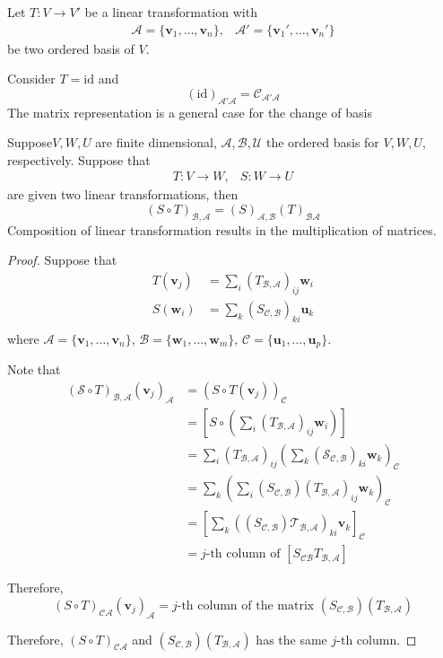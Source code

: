 \begin{remark}
Let $T:V\to V'$ be a linear transformation with 
\[
\begin{array}{ll}
\mathcal{A}=\{\bm v_1,\dots,\bm v_n\},
&
\mathcal{A}'=\{\bm v_1',\dots,\bm v_n'\}
\end{array}
\]
be two ordered basis of $V$.

Consider $T=\text{id}$ and 
\[
(\text{id})_{\mathcal{A}'\mathcal{A}}=\mathcal{C}_{\mathcal{A}'\mathcal{A}}
\]
The matrix representation is a general case for the change of basis
\end{remark}

\begin{proposition}[Functoriality]
Suppose$V,W,U$ are finite dimensional,
$\mathcal{A},\mathcal{B},\mathcal{U}$ the ordered basis for $V,W,U$, respectively. Suppose that
\[
\begin{array}{ll}
T:V\to W,
&
S:W\to U
\end{array}
\]
are given two linear transformations, then
\[
(S\circ T)_{\mathcal{B},\mathcal{A}}
=
(S)_{\mathcal{A},\mathcal{B}}(T)_{\mathcal{B}\mathcal{A}}
\]
Composition of linear transformation results in the multiplication of matrices.
\end{proposition}
\begin{proof}
Suppose that
\begin{align*}
T(\bm v_j)&=\sum_i(T_{\mathcal{B},\mathcal{A}})_{ij}\bm w_i\\
S(\bm w_i)&=\sum_k(S_{\mathcal{C},\mathcal{B}})_{ki}\bm u_k\\
\end{align*}
where $\mathcal{A}=\{\bm v_1,\dots,\bm v_n\}$, $\mathcal{B}=\{\bm w_1,\dots,\bm w_m\}$, $\mathcal{C}=\{\bm u_1,\dots,\bm u_p\}$.

Note that
\begin{align*}
(\mathcal{S}\circ T)_{\mathcal{B},\mathcal{A}}(\bm v_j)_{\mathcal{A}}
&=
(S\circ T(\bm v_j))_{\mathcal{C}}\\
&=
\left[S\circ\left(\sum_i(T_{\mathcal{B},\mathcal{A}})_{ij}\bm w_i\right)\right]\\
&=
\sum_i(T_{\mathcal{B},\mathcal{A}})_{ij}\left(
\sum_k(\mathcal{S}_{\mathcal{C},\mathcal{B}})_{ki}\bm w_k
\right)_{\mathcal{C}}\\
&=\sum_k
\left(
\sum_i(S_{\mathcal{C},\mathcal{B}})(T_{\mathcal{B},\mathcal{A}})_{ij}\bm w_k
\right)_{\mathcal{C}}\\
&=
\left[
\sum_k
(
(S_{\mathcal{C},\mathcal{B}})\mathcal{T}_{\mathcal{B},\mathcal{A}}
)_{ki}\bm v_k
\right]_{\mathcal{C}}\\
&=\text{$j$-th column of }[S_{\mathcal{C}\mathcal{B}}T_{\mathcal{B},\mathcal{A}}]
\end{align*}

Therefore,
\[
(S\circ T)_{\mathcal{C}\mathcal{A}}(\bm v_j)_{\mathcal{A}}
=
\text{$j$-th column of the matrix }(S_{\mathcal{C},\mathcal{B}})(T_{\mathcal{B},\mathcal{A}})
\]

Therefore, $(S\circ T)_{\mathcal{C}\mathcal{A}}$ and $(S_{\mathcal{C},\mathcal{B}})(T_{\mathcal{B},\mathcal{A}})$ has the same $j$-th column.
\end{proof}

